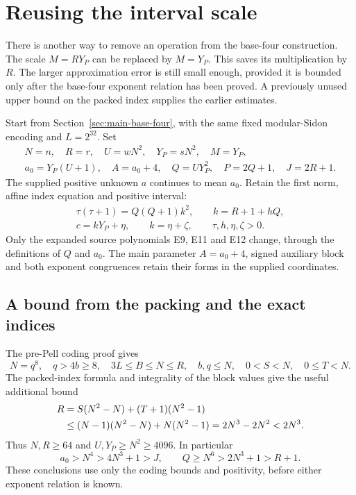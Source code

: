 \section{Reusing the interval scale}
\label{sec:unit-scale}

There is another way to remove an operation from the base-four
construction. The scale $M=RY_P$ can be replaced by $M=Y_P$.
This saves its multiplication by $R$. The larger approximation error
is still small enough, provided it is bounded only after the
base-four exponent relation has been proved. A previously unused
upper bound on the packed index supplies the earlier estimates.

Start from Section~\ref{sec:main-base-four}, with the same fixed
modular-Sidon encoding and $L=2^{32}$. Set
\[
\begin{gathered}
 N=n,\quad R=r,\quad U=wN^2,\quad Y_P=sN^2,\quad M=Y_P,\\
 a_0=Y_P(U+1),\quad A=a_0+4,\quad
 Q=UY_P^2,\quad P=2Q+1,\quad J=2R+1.
\end{gathered}
\]
The supplied positive unknown $a$ continues to mean $a_0$.
Retain the first norm, affine index equation and positive interval:
\begin{equation}\label{eq:unit-scale-system}
\begin{gathered}
 \tau(\tau+1)=Q(Q+1)k^2,\qquad k=R+1+hQ,\\
 c=kY_P+\eta,\qquad k=\eta+\zeta,
 \qquad\tau,h,\eta,\zeta>0.
\end{gathered}
\end{equation}
Only the expanded source polynomials E9, E11 and E12 change, through
the definitions of $Q$ and $a_0$. The main parameter $A=a_0+4$,
signed auxiliary block and both exponent congruences retain their
forms in the supplied coordinates.

\subsection{A bound from the packing and the exact indices}

The pre-Pell coding proof gives
\[
 N=q^8,\quad q>4b\ge8,\quad 3L\le B\le N\le R,
 \quad b,q\le N,
 \quad0<S<N,\quad0\le T<N.
\]
The packed-index formula and integrality of the block values give
the useful additional bound
\begin{align}
 R&=S(N^2-N)+(T+1)(N^2-1)\notag\\
  &\le(N-1)(N^2-N)+N(N^2-1)
   =2N^3-2N^2<2N^3.\label{eq:unit-scale-rbound}
\end{align}
Thus $N,R\ge64$ and $U,Y_P\ge N^2\ge4096$. In particular
\begin{equation}\label{eq:unit-scale-initial}
 a_0>N^4>4N^3+1>J,\qquad
 Q\ge N^6>2N^3+1>R+1.
\end{equation}
These conclusions use only the coding bounds and positivity, before
either exponent relation is known.

